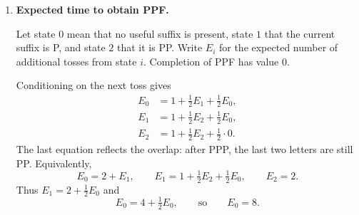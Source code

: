 \documentclass[11pt]{article}
\begin{document}
\begin{enumerate}[leftmargin=*, itemsep=1.0em]
\medskip
Now the target pattern starts with T, so the natural states are the \emph{longest suffix} of the observed sequence that is also a prefix of THH.

Let:
\begin{itemize}
\item $E_0$: expected remaining flips from the start state (no useful suffix),
\item $E_T$: expected remaining flips given the last flip is T,
\item $E_{TH}$: expected remaining flips given the last two flips are TH,
\item absorbing after THH.
\end{itemize}

Transitions:
\begin{itemize}
\item From start: H gives no prefix (back to start), T gives state T:
\[
E_0=1+\tfrac12 E_0+\tfrac12 E_T \ \Rightarrow\ E_0=2+E_T.
\]
\item From state T: T keeps you in T; H moves you to TH:
\[
E_T=1+\tfrac12 E_T+\tfrac12 E_{TH}\ \Rightarrow\ E_T=2+E_{TH}.
\]
\item From state TH: H completes THH (done); T makes the last flip T, so back to state T:
\[
E_{TH}=1+\tfrac12\cdot 0+\tfrac12 E_T=1+\tfrac12 E_T.
\]
\end{itemize}

Solve:
\[
E_T=2+E_{TH}=2+1+\tfrac12 E_T
\ \Rightarrow\ 
\tfrac12 E_T=3
\ \Rightarrow\
E_T=6.
\]
Then $E_0=2+E_T=8$. Hence the expected number of flips to see THH is $\boxed{8}$.

\item \textbf{Expected time to obtain PPF.}

Let state $0$ mean that no useful suffix is present, state $1$ that the current
suffix is P, and state $2$ that it is PP. Write $E_i$ for the expected number
of additional tosses from state $i$. Completion of PPF has value $0$.

Conditioning on the next toss gives
\[
\begin{aligned}
E_0&=1+\tfrac12E_1+\tfrac12E_0,\\
E_1&=1+\tfrac12E_2+\tfrac12E_0,\\
E_2&=1+\tfrac12E_2+\tfrac12\cdot0.
\end{aligned}
\]
The last equation reflects the overlap: after PPP, the last two letters are
still PP. Equivalently,
\[
E_0=2+E_1,\qquad E_1=1+\tfrac12E_2+\tfrac12E_0,
\qquad E_2=2.
\]
Thus $E_1=2+\tfrac12E_0$ and
\[
E_0=4+\tfrac12E_0,
\qquad\text{so}\qquad
\boxed{E_0=8}.
\]


\end{enumerate}
\end{document}
